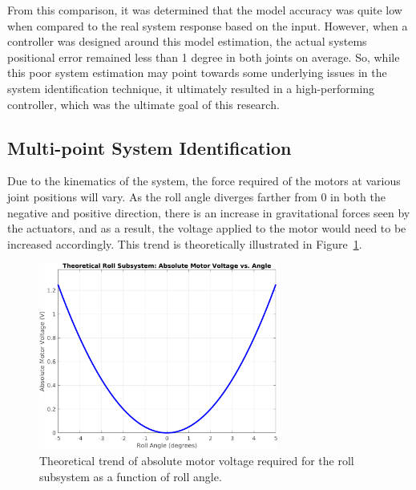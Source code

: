 From this comparison, it was determined that the model accuracy was quite low when compared to the real system response based on the input. However, when a controller was designed around this model estimation, the actual systems positional error remained less than 1 degree in both joints on average. So, while this poor system estimation may point towards some underlying issues in the system identification technique, it ultimately resulted in a high-performing controller, which was the ultimate goal of this research.


\subsection{Multi-point System Identification}

Due to the kinematics of the system, the force required of the motors at various joint positions will vary. As the roll angle diverges farther from 0 in both the negative and positive direction, there is an increase in gravitational forces seen by the actuators, and as a result, the voltage applied to the motor would need to be increased accordingly. This trend is theoretically illustrated in Figure~\ref{fig:roll_voltage_trend}.

\begin{figure}[H]
    \centering
    \includegraphics[width=0.7\textwidth]{figures/Roll_Subsystem_Theoretical_Trend.png}
    \caption{Theoretical trend of absolute motor voltage required for the roll subsystem as a function of roll angle.}
    \label{fig:roll_voltage_trend}
\end{figure}


